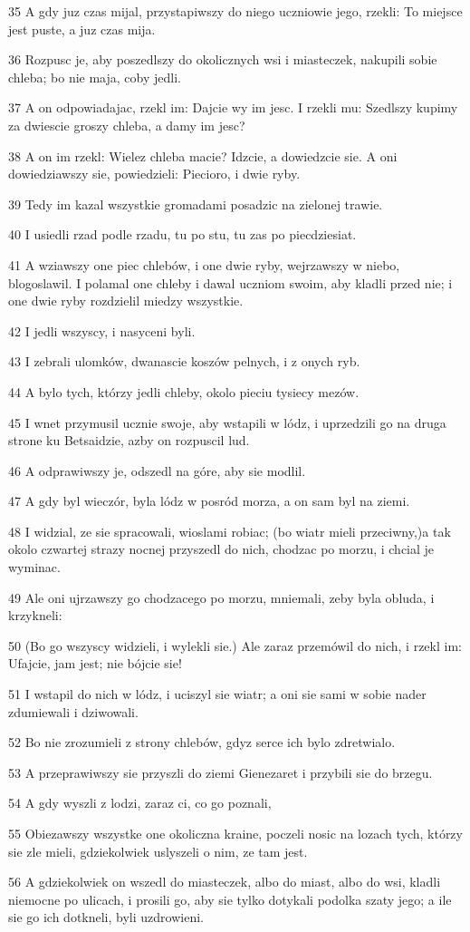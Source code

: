 \par 35 A gdy juz czas mijal, przystapiwszy do niego uczniowie jego, rzekli: To miejsce jest puste, a juz czas mija.
\par 36 Rozpusc je, aby poszedlszy do okolicznych wsi i miasteczek, nakupili sobie chleba; bo nie maja, coby jedli.
\par 37 A on odpowiadajac, rzekl im: Dajcie wy im jesc. I rzekli mu: Szedlszy kupimy za dwiescie groszy chleba, a damy im jesc?
\par 38 A on im rzekl: Wielez chleba macie? Idzcie, a dowiedzcie sie. A oni dowiedziawszy sie, powiedzieli: Piecioro, i dwie ryby.
\par 39 Tedy im kazal wszystkie gromadami posadzic na zielonej trawie.
\par 40 I usiedli rzad podle rzadu, tu po stu, tu zas po piecdziesiat.
\par 41 A wziawszy one piec chlebów, i one dwie ryby, wejrzawszy w niebo, blogoslawil. I polamal one chleby i dawal uczniom swoim, aby kladli przed nie; i one dwie ryby rozdzielil miedzy wszystkie.
\par 42 I jedli wszyscy, i nasyceni byli.
\par 43 I zebrali ulomków, dwanascie koszów pelnych, i z onych ryb.
\par 44 A bylo tych, którzy jedli chleby, okolo pieciu tysiecy mezów.
\par 45 I wnet przymusil ucznie swoje, aby wstapili w lódz, i uprzedzili go na druga strone ku Betsaidzie, azby on rozpuscil lud.
\par 46 A odprawiwszy je, odszedl na góre, aby sie modlil.
\par 47 A gdy byl wieczór, byla lódz w posród morza, a on sam byl na ziemi.
\par 48 I widzial, ze sie spracowali, wioslami robiac; (bo wiatr mieli przeciwny,)a tak okolo czwartej strazy nocnej przyszedl do nich, chodzac po morzu, i chcial je wyminac.
\par 49 Ale oni ujrzawszy go chodzacego po morzu, mniemali, zeby byla obluda, i krzykneli:
\par 50 (Bo go wszyscy widzieli, i wylekli sie.) Ale zaraz przemówil do nich, i rzekl im: Ufajcie, jam jest; nie bójcie sie!
\par 51 I wstapil do nich w lódz, i uciszyl sie wiatr; a oni sie sami w sobie nader zdumiewali i dziwowali.
\par 52 Bo nie zrozumieli z strony chlebów, gdyz serce ich bylo zdretwialo.
\par 53 A przeprawiwszy sie przyszli do ziemi Gienezaret i przybili sie do brzegu.
\par 54 A gdy wyszli z lodzi, zaraz ci, co go poznali,
\par 55 Obiezawszy wszystke one okoliczna kraine, poczeli nosic na lozach tych, którzy sie zle mieli, gdziekolwiek uslyszeli o nim, ze tam jest.
\par 56 A gdziekolwiek on wszedl do miasteczek, albo do miast, albo do wsi, kladli niemocne po ulicach, i prosili go, aby sie tylko dotykali podolka szaty jego; a ile sie go ich dotkneli, byli uzdrowieni.

